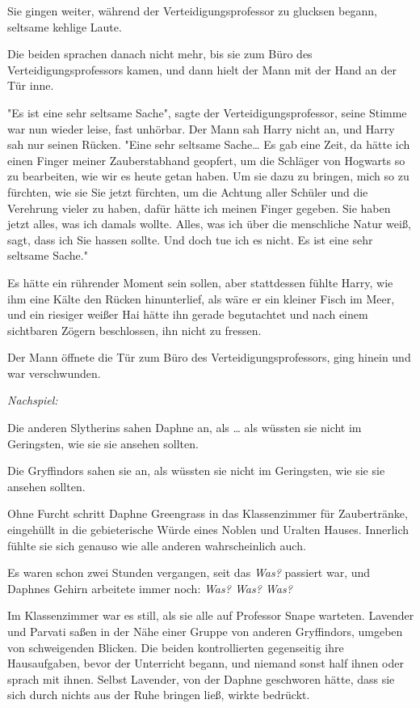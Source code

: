 {Sie gingen weiter, während der Verteidigungsprofessor zu glucksen begann, seltsame kehlige Laute.

Die beiden sprachen danach nicht mehr, bis sie zum Büro des Verteidigungsprofessors kamen, und dann hielt der Mann mit der Hand an der Tür inne.

"Es ist eine sehr seltsame Sache", sagte der Verteidigungsprofessor, seine Stimme war nun wieder leise, fast unhörbar. Der Mann sah Harry nicht an, und Harry sah nur seinen Rücken. "Eine sehr seltsame Sache… Es gab eine Zeit, da hätte ich einen Finger meiner Zauberstabhand geopfert, um die Schläger von Hogwarts so zu bearbeiten, wie wir es heute getan haben. Um sie dazu zu bringen, mich so zu fürchten, wie sie Sie jetzt fürchten, um die Achtung aller Schüler und die Verehrung vieler zu haben, dafür hätte ich meinen Finger gegeben. Sie haben jetzt alles, was ich damals wollte. Alles, was ich über die menschliche Natur weiß, sagt, dass ich Sie hassen sollte. Und doch tue ich es nicht. Es ist eine sehr seltsame Sache."

Es hätte ein rührender Moment sein sollen, aber stattdessen fühlte Harry, wie ihm eine Kälte den Rücken hinunterlief, als wäre er ein kleiner Fisch im Meer, und ein riesiger weißer Hai hätte ihn gerade begutachtet und nach einem sichtbaren Zögern beschlossen, ihn nicht zu fressen.

Der Mann öffnete die Tür zum Büro des Verteidigungsprofessors, ging hinein und war verschwunden.

\emph{\emph{Nachspiel:}}

Die anderen Slytherins sahen Daphne an, als … als wüssten sie nicht im Geringsten, wie sie sie ansehen sollten.

Die Gryffindors sahen sie an, als wüssten sie nicht im Geringsten, wie sie sie ansehen sollten.

Ohne Furcht schritt Daphne Greengrass in das Klassenzimmer für Zaubertränke, eingehüllt in die gebieterische Würde eines Noblen und Uralten Hauses. Innerlich fühlte sie sich genauso wie alle anderen wahrscheinlich auch.

Es waren schon zwei Stunden vergangen, seit das \emph{Was?} passiert war, und Daphnes Gehirn arbeitete immer noch: \emph{Was? Was? Was?}

Im Klassenzimmer war es still, als sie alle auf Professor Snape warteten. Lavender und Parvati saßen in der Nähe einer Gruppe von anderen Gryffindors, umgeben von schweigenden Blicken. Die beiden kontrollierten gegenseitig ihre Hausaufgaben, bevor der Unterricht begann, und niemand sonst half ihnen oder sprach mit ihnen. Selbst Lavender, von der Daphne geschworen hätte, dass sie sich durch nichts aus der Ruhe bringen ließ, wirkte bedrückt.

}
